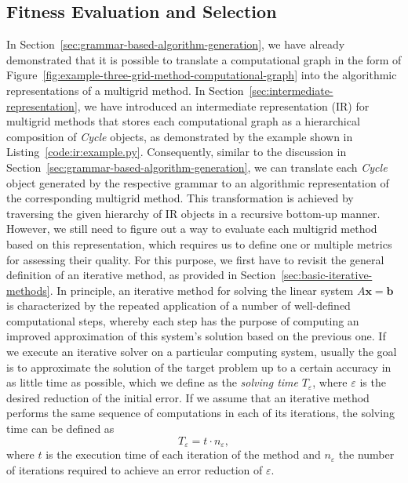 \subsection{Fitness Evaluation and Selection}
\label{sec:fitness-evaluation-and-selection}
In Section~\ref{sec:grammar-based-algorithm-generation},
we have already demonstrated that it is possible to translate a computational graph in the form of Figure~\ref{fig:example-three-grid-method-computational-graph} into the algorithmic representations of a multigrid method.
In Section~\ref{sec:intermediate-representation}, we have introduced an intermediate representation (IR) for multigrid methods that stores each computational graph as a hierarchical composition of \emph{Cycle} objects, as demonstrated by the example shown in Listing~\ref{code:ir:example.py}.
Consequently, similar to the discussion in Section~\ref{sec:grammar-based-algorithm-generation}, we can translate each \emph{Cycle} object generated by the respective grammar to an algorithmic representation of the corresponding multigrid method.
This transformation is achieved by traversing the given hierarchy of IR objects in a recursive bottom-up manner.
However, we still need to figure out a way to evaluate each multigrid method based on this representation, which requires us to define one or multiple metrics for assessing their quality.
For this purpose, we first have to revisit the general definition of an iterative method, as provided in Section~\ref{sec:basic-iterative-methods}.
In principle, an iterative method for solving the linear system $A \bm{x} = \bm{b}$ is characterized by the repeated application of a number of well-defined computational steps, whereby each step has the purpose of computing an improved approximation of this system's solution based on the previous one.
If we execute an iterative solver on a particular computing system, usually the goal is to approximate the solution of the target problem up to a certain accuracy in as little time as possible, which we define as the \emph{solving time} $T_{\varepsilon}$, where $\varepsilon$ is the desired reduction of the initial error. 
If we assume that an iterative method performs the same sequence of computations in each of its iterations, the solving time can be defined as
\begin{equation}
	T_{\varepsilon} = t \cdot n_{\varepsilon},
	\label{eq:solving-time-basic}
\end{equation} 
where $t$ is the execution time of each iteration of the method and $n_{\varepsilon}$ the number of iterations required to achieve an error reduction of $\varepsilon$.
